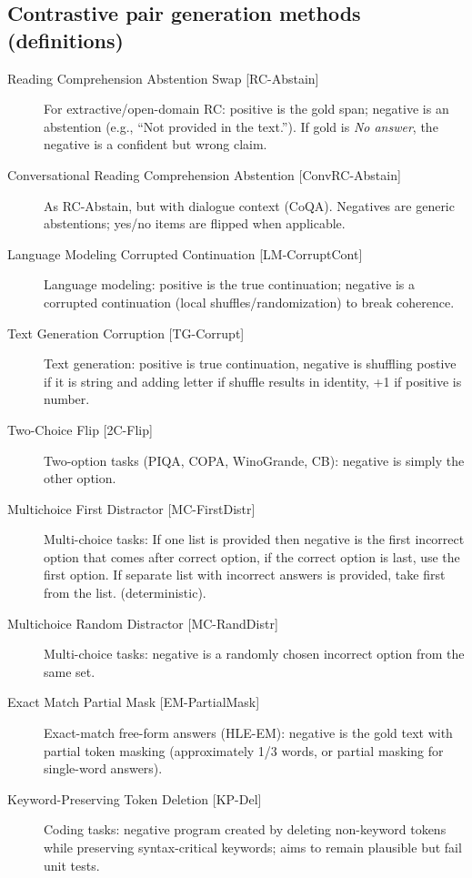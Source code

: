 \documentclass{article}
\begin{document}
\subsection*{Contrastive pair generation methods (definitions)}
\begin{description}
  \item[Reading Comprehension Abstention Swap \textnormal{[RC-Abstain]}] For extractive/open-domain RC: positive is the gold span; negative is an abstention (e.g., ``Not provided in the text.''). If gold is \emph{No answer}, the negative is a confident but wrong claim.
  \item[Conversational Reading Comprehension Abstention \textnormal{[ConvRC-Abstain]}] As RC-Abstain, but with dialogue context (CoQA). Negatives are generic abstentions; yes/no items are flipped when applicable.
  \item[Language Modeling Corrupted Continuation \textnormal{[LM-CorruptCont]}] Language modeling: positive is the true continuation; negative is a corrupted continuation (local shuffles/randomization) to break coherence.
  \item [Text Generation Corruption \textnormal{[TG-Corrupt]}] Text generation: positive is true continuation, negative is shuffling postive if it is string and adding letter if shuffle results in identity, +1 if positive is number.
  \item[Two-Choice Flip \textnormal{[2C-Flip]}] Two-option tasks (PIQA, COPA, WinoGrande, CB): negative is simply the other option.
  \item[Multichoice First Distractor \textnormal{[MC-FirstDistr]}] Multi-choice tasks: If one list is provided then negative is the first incorrect option that comes after correct option, if the correct option is last, use the first option. If separate list with incorrect answers is provided, take first from the list. (deterministic).
  \item[Multichoice Random Distractor \textnormal{[MC-RandDistr]}] Multi-choice tasks: negative is a randomly chosen incorrect option from the same set.
  \item[Exact Match Partial Mask \textnormal{[EM-PartialMask]}] Exact-match free-form answers (HLE-EM): negative is the gold text with partial token masking (approximately 1/3 words, or partial masking for single-word answers).
  \item[Keyword-Preserving Token Deletion \textnormal{[KP-Del]}] Coding tasks: negative program created by deleting non-keyword tokens while preserving syntax-critical keywords; aims to remain plausible but fail unit tests.

\end{description}
\end{document}
